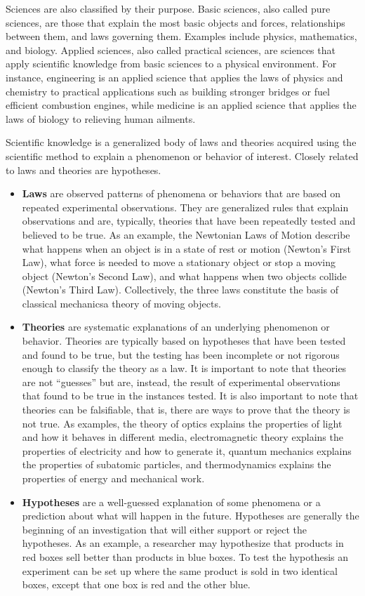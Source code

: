 Sciences are also classified by their purpose. Basic sciences, also called pure sciences, are those that explain the most basic objects and forces, relationships between them, and laws governing them. Examples include physics, mathematics, and biology. Applied sciences, also called practical sciences, are sciences that apply scientific knowledge from basic sciences to a physical environment. For instance, engineering is an applied science that applies the laws of physics and chemistry to practical applications such as building stronger bridges or fuel efficient combustion engines, while medicine is an applied science that applies the laws of biology to relieving human ailments.

Scientific knowledge is a generalized body of laws and theories acquired using the scientific method to explain a phenomenon or behavior of interest. Closely related to laws and theories are hypotheses.

\begin{itemize}
	\item \textbf{Laws} are observed patterns of phenomena or behaviors that are based on repeated experimental observations. They are generalized rules that explain observations and are, typically, theories that have been repeatedly tested and believed to be true. As an example, the Newtonian Laws of Motion describe what happens when an object is in a state of rest or motion (Newton's First Law), what force is needed to move a stationary object or stop a moving object (Newton's Second Law), and what happens when two objects collide (Newton's Third Law). Collectively, the three laws constitute the basis of classical mechanics\textemdash a theory of moving objects. 

	\item \textbf{Theories} are systematic explanations of an underlying phenomenon or behavior. Theories are typically based on hypotheses that have been tested and found to be true, but the testing has been incomplete or not rigorous enough to classify the theory as a law. It is important to note that theories are not ``guesses'' but are, instead, the result of experimental observations that found to be true in the instances tested. It is also important to note that theories can be falsifiable, that is, there are ways to prove that the theory is not true. As examples, the theory of optics explains the properties of light and how it behaves in different media, electromagnetic theory explains the properties of electricity and how to generate it, quantum mechanics explains the properties of subatomic particles, and thermodynamics explains the properties of energy and mechanical work. 

	\item \textbf{Hypotheses} are a well-guessed explanation of some phenomena or a prediction about what will happen in the future. Hypotheses are generally the beginning of an investigation that will either support or reject the hypotheses. As an example, a researcher may hypothesize that products in red boxes sell better than products in blue boxes. To test the hypothesis an experiment can be set up where the same product is sold in two identical boxes, except that one box is red and the other blue.
\end{itemize}

